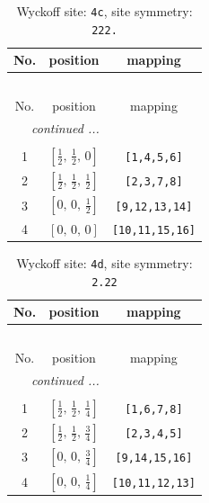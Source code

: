 \documentclass[fleqn,8pt]{jsarticle}
\begin{document}
\renewcommand{\arraystretch}{1.2}
\begin{longtable}{ccc}
\caption{Wyckoff site: {\tt 4c}, site symmetry: {\tt 222.}}
 \\
 \hline \hline
No. & position & mapping \\ \hline \endfirsthead

\multicolumn{2}{l}{\tablename\ \thetable{}} \\
 \hline \hline
No. & position & mapping \\ \hline \endhead

 \hline \hline
\multicolumn{2}{r}{\footnotesize\it continued ...} \\ \endfoot

 \hline \hline
\multicolumn{2}{r}{} \\ \endlastfoot

1 & $\left[ \frac{1}{2},\, \frac{1}{2},\, 0 \right]$ & {\tt [1,4,5,6]} \\ \hline
2 & $\left[ \frac{1}{2},\, \frac{1}{2},\, \frac{1}{2} \right]$ & {\tt [2,3,7,8]} \\ \hline
3 & $\left[ 0,\, 0,\, \frac{1}{2} \right]$ & {\tt [9,12,13,14]} \\ \hline
4 & $\left[ 0,\, 0,\, 0 \right]$ & {\tt [10,11,15,16]} \\
\end{longtable}
\renewcommand{\arraystretch}{1.2}
\begin{longtable}{ccc}
\caption{Wyckoff site: {\tt 4d}, site symmetry: {\tt 2.22}}
 \\
 \hline \hline
No. & position & mapping \\ \hline \endfirsthead

\multicolumn{2}{l}{\tablename\ \thetable{}} \\
 \hline \hline
No. & position & mapping \\ \hline \endhead

 \hline \hline
\multicolumn{2}{r}{\footnotesize\it continued ...} \\ \endfoot

 \hline \hline
\multicolumn{2}{r}{} \\ \endlastfoot

1 & $\left[ \frac{1}{2},\, \frac{1}{2},\, \frac{1}{4} \right]$ & {\tt [1,6,7,8]} \\ \hline
2 & $\left[ \frac{1}{2},\, \frac{1}{2},\, \frac{3}{4} \right]$ & {\tt [2,3,4,5]} \\ \hline
3 & $\left[ 0,\, 0,\, \frac{3}{4} \right]$ & {\tt [9,14,15,16]} \\ \hline
4 & $\left[ 0,\, 0,\, \frac{1}{4} \right]$ & {\tt [10,11,12,13]} \\
\end{longtable}
\end{document}
